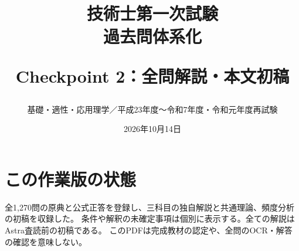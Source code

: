 \documentclass[a4paper,10pt,openany]{ltjsbook}
\title{技術士第一次試験\\過去問体系化\par\large Checkpoint 2：全問解説・本文初稿}
\author{基礎・適性・応用理学／平成23年度〜令和7年度・令和元年度再試験}
\date{2026年10月14日}
\begin{document}
\maketitle
\frontmatter
\chapter*{この作業版の状態}
全1,270問の原典と公式正答を登録し、三科目の独自解説と共通理論、頻度分析の初稿を収録した。
条件や解釈の未確定事項は個別に表示する。全ての解説はAstra査読前の初稿である。
このPDFは完成教材の認定や、全問のOCR・解答の確認を意味しない。
\tableofcontents
\mainmatter












\appendix







\printbibliography[heading=bibintoc,title={参照資料}]
\end{document}
